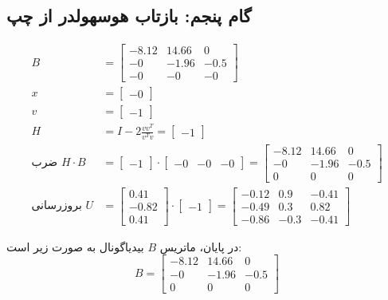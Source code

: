 \subsection*{گام پنجم: بازتاب هوسهولدر از چپ }
\begin{align*}
B &= \begin{bmatrix}
-8.12 & 14.66 & 0 \\
 -0 & -1.96 & -0.5 \\
 -0 & -0 & -0
\end{bmatrix} \\
x &= \begin{bmatrix}
-0
\end{bmatrix} \\
v &= \begin{bmatrix}
-1
\end{bmatrix} \\
H &= I - 2 \frac{vv^T}{v^T v} = \begin{bmatrix}
-1
\end{bmatrix} \\
\text{ضرب } H \cdot B &= \begin{bmatrix}
-1
\end{bmatrix} \cdot \begin{bmatrix}
-0 & -0 & -0
\end{bmatrix} = \begin{bmatrix}
-8.12 & 14.66 & 0 \\
 -0 & -1.96 & -0.5 \\
 0 & 0 & 0
\end{bmatrix} \\
\text{بروزرسانی } U &= \begin{bmatrix}
 0.41 \\
-0.82 \\
 0.41
\end{bmatrix} \cdot \begin{bmatrix}
-1
\end{bmatrix} = \begin{bmatrix}
-0.12 & 0.9 & -0.41 \\
-0.49 & 0.3 & 0.82 \\
-0.86 & -0.3 & -0.41
\end{bmatrix}
\end{align*}

در پایان، ماتریس \( B \) بیدیاگونال به صورت زیر است:
\[
B = \begin{bmatrix}
-8.12 & 14.66 & 0 \\
 -0 & -1.96 & -0.5 \\
 0 & 0 & 0
\end{bmatrix}
\]


